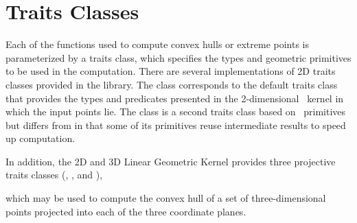 \section{Traits Classes}

Each of the functions used to compute convex hulls or extreme points
is parameterized by a traits class, which specifies the types and geometric
primitives to be used in the computation.  There are several implementations 
of 2D traits classes provided in the library.  The class
corresponds to the default traits class that provides the types and 
predicates presented in the 2-dimensional \cgal\ kernel in which the input 
points lie.  The class 
is a second traits class based on \cgal\ primitives but differs from
 in that some of its primitives reuse
intermediate results to speed up computation.

In addition, the 2D and 3D Linear Geometric Kernel provides three projective traits classes 
(, 
, and 
),

which may be used to compute the convex hull of a set of three-dimensional
points projected into each of the three coordinate planes.

